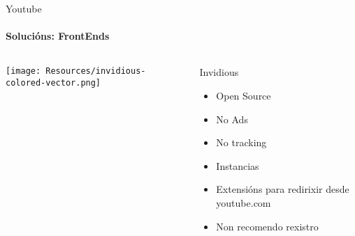 \documentclass{beamer}
\begin{document}
\begin{frame}{Youtube}
  \framesubtitle{Solucións: FrontEnds}

  \begin{columns}
    \begin{column}{0.5\textwidth}
      \texttt{[image: Resources/invidious-colored-vector.png]}

      \vspace{1cm}


    \end{column}

    \begin{column}{0.4\textwidth}
      \begin{block}{Invidious}
        \begin{itemize}
          \item Open Source
          \item No Ads
          \item No tracking
          \item Instancias
          \item Extensións para redirixir desde youtube.com
          \item Non recomendo rexistro
        \end{itemize}
      \end{block}

    \end{column}

  \end{columns}

\end{frame}


\end{document}
